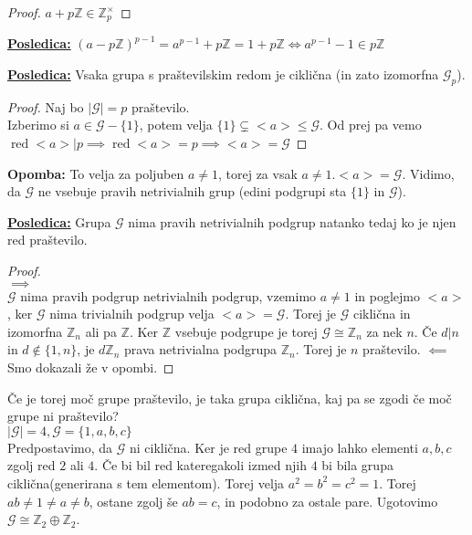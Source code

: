 \documentclass[a4paper]{article}
\newcounter{environment:definition_counter}
\newcounter{environment:theorem_counter}
\newcounter{environment:statement_counter}
\newenvironment{remark}
{\textbf{Opomba:}}
{}
\newenvironment{corollary}
{\underline{\textbf{Posledica:}}}
{}
\newcommand{\ord}{\ensuremath{\operatorname{red}}} %
\begin{document}
\begin{proof}
$a + p \mathbb{Z} \in \mathbb{Z}_p^\times$
\end{proof}

\begin{corollary}
$(a - p\mathbb{Z})^{p-1} = a^{p-1} + p \mathbb{Z} = 1 + p\mathbb{Z} \iff a^{p-1} - 1 \in p\mathbb{Z}$
\end{corollary}

\begin{corollary}
Vsaka grupa s praštevilskim redom je ciklična (in zato izomorfna $\mathcal{G}_p$).
\end{corollary}

\begin{proof}
Naj bo $|\mathcal{G}| = p$ praštevilo. \\Izberimo si $a \in \mathcal{G} - \{1 \}$, potem velja $\{1\} \subsetneq <a> \leq \mathcal{G}$. Od prej pa vemo $\ord <a> | p \implies \ord <a> = p \implies <a> = \mathcal{G}$
\end{proof}

\begin{remark}
To velja za poljuben $a \neq 1$, torej za vsak $a \neq 1. <a> = \mathcal{G}$. Vidimo, da $\mathcal{G}$ ne vsebuje pravih netrivialnih grup (edini podgrupi sta $\{1\}$ in $\mathcal{G}$).
\end{remark}

\begin{corollary}
Grupa $\mathcal{G}$ nima pravih netrivialnih podgrup natanko tedaj ko je njen red praštevilo.
\end{corollary}

\begin{proof}\leavevmode\\
$\implies$\\
$\mathcal{G}$ nima pravih podgrup netrivialnih podgrup, vzemimo $a \neq 1$ in poglejmo $<a>$, ker $\mathcal{G}$ nima trivialnih podgrup velja $<a> = \mathcal{G}$. Torej je $\mathcal{G}$ ciklična in izomorfna $\mathbb{Z}_n$ ali pa $\mathbb{Z}$. Ker $\mathbb{Z}$ vsebuje podgrupe je torej $\mathcal{G} \cong \mathbb{Z}_n$ za nek $n$. Če $d|n$ in $d \not \in \{1,n\}$, je $d\mathbb{Z}_n$ prava netrivialna podgrupa $\mathbb{Z}_n$. Torej je $n$ praštevilo.
$\impliedby$ Smo dokazali že v opombi.
\end{proof}

Če je torej moč grupe praštevilo, je taka grupa ciklična, kaj pa se zgodi če moč grupe ni praštevilo?\\
$|\mathcal{G}| = 4, \mathcal{G} = \{1,a,b,c\}$\\
Predpostavimo, da $\mathcal{G}$ ni ciklična. Ker je red grupe $4$ imajo lahko elementi $a,b,c$ zgolj red $2$ ali $4$. Če bi bil red kateregakoli izmed njih $4$ bi bila grupa ciklična(generirana s tem elementom). Torej velja $a^2=b^2=c^2 = 1$. Torej $ab \neq 1 \neq a \neq b$, ostane zgolj še $ab = c$, in podobno za ostale pare. Ugotovimo $\mathcal{G} \cong \mathbb{Z}_2 \oplus \mathbb{Z}_2$.
\end{document}
